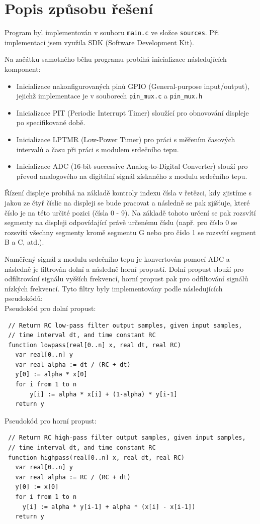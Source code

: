 \documentclass[a4paper, 11pt]{article}
\begin{document}
\section{Popis způsobu řešení}
Program byl implementován v souboru \verb|main.c| ve složce \verb|sources|. Při implementaci jsem využila SDK (Software Development Kit). 

Na začátku samotného běhu programu probíhá inicializace následujících komponent:
\begin{itemize}
    \item Inicializace nakonfigurovaných pinů GPIO (General-purpose input/output), jejichž implementace je v souborech  \verb|pin_mux.c| a \verb|pin_mux.h|
    \item Inicializace PIT (Periodic Interrupt Timer) sloužící pro obnovování displeje po specifikované době.
    \item Inicializace LPTMR (Low-Power Timer) pro práci s měřením časových intervalů a času při práci s modulem srdečního tepu.
    \item Inicializace ADC (16-bit successive Analog-to-Digital Converter) slouží pro převod analogového na digitální signál získaného z modulu srdečního tepu.
\end{itemize}

Řízení displeje probíhá na základě kontroly indexu čísla v řetězci, kdy zjistíme s jakou ze čtyř číslic na displeji se bude pracovat a následně se pak zjišťuje, které číslo je na této určité pozici (čísla 0 - 9). Na základě tohoto určení se pak rozsvítí segmenty na displeji odpovídající právě určenému číslu (např. pro číslo 0 se rozsvítí všechny segmenty kromě segmentu G nebo pro číslo 1 se rozsvítí segment B a C, atd.). 

Naměřený signál z modulu srdečního tepu je konvertován pomocí ADC a následně je filtrován dolní a následně horní propustí. Dolní propust slouží pro odfiltrování signálu vyšších frekvencí, horní propust pak pro odfiltování signálů nízkých frekvencí. Tyto filtry byly implementovány podle následujících pseudokódů:\\
Pseudokód pro dolní propust:\cite{Lowpass:web}
\begin{lstlisting}
 // Return RC low-pass filter output samples, given input samples,
 // time interval dt, and time constant RC
 function lowpass(real[0..n] x, real dt, real RC)
   var real[0..n] y
   var real alpha := dt / (RC + dt)
   y[0] := alpha * x[0]
   for i from 1 to n
       y[i] := alpha * x[i] + (1-alpha) * y[i-1]
   return y
\end{lstlisting}
Pseudokód pro horní propust:\cite{Highpass:web}
\begin{lstlisting}
 // Return RC high-pass filter output samples, given input samples,
 // time interval dt, and time constant RC
 function highpass(real[0..n] x, real dt, real RC)
   var real[0..n] y
   var real alpha := RC / (RC + dt)
   y[0] := x[0]
   for i from 1 to n
     y[i] := alpha * y[i-1] + alpha * (x[i] - x[i-1])
   return y
\end{lstlisting}
\end{document}
